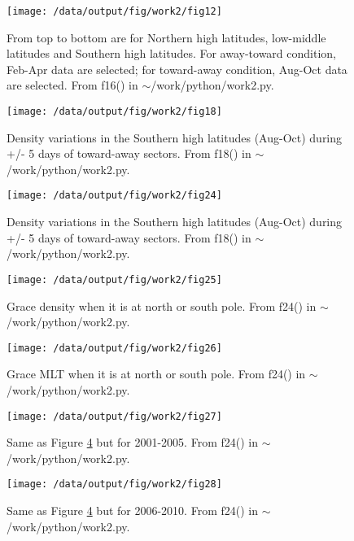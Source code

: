 \documentclass[12pt,a4paper]{article}
\begin{document}
\begin{figure}[!ht]
    \centering
    \texttt{[image: /data/output/fig/work2/fig12]}
    \label{fig7}
    \caption{From top to bottom are for Northern high latitudes, low-middle latitudes and Southern high latitudes. For away-toward condition, Feb-Apr data are selected; for toward-away condition, Aug-Oct data are selected. From f16() in $\sim$/work/python/work2.py.}
\end{figure}

\begin{figure}[!ht]
    \centering
    \texttt{[image: /data/output/fig/work2/fig18]}
    \label{fig8}
    \caption{Density variations in the Southern high latitudes (Aug-Oct) during +/- 5 days of toward-away sectors. From f18() in $\sim$/work/python/work2.py.}
\end{figure}

\begin{figure}[!ht]
    \centering
    \texttt{[image: /data/output/fig/work2/fig24]}
    \label{fig9}
    \caption{Density variations in the Southern high latitudes (Aug-Oct) during +/- 5 days of toward-away sectors. From f18() in $\sim$/work/python/work2.py.}
\end{figure}

\begin{figure}[!ht]
    \centering
    \texttt{[image: /data/output/fig/work2/fig25]}
    \caption{Grace density when it is at north or south pole. From f24() in $\sim$/work/python/work2.py.}
    \label{fig10}
\end{figure}

\begin{figure}[!ht]
    \centering
    \texttt{[image: /data/output/fig/work2/fig26]}
    \label{fig11}
    \caption{Grace MLT when it is at north or south pole. From f24() in $\sim$/work/python/work2.py.}
\end{figure}

\begin{figure}[!ht]
    \centering
    \texttt{[image: /data/output/fig/work2/fig27]}
    \label{fig12}
    \caption{Same as Figure \ref{fig10} but for 2001-2005. From f24() in $\sim$/work/python/work2.py.}
\end{figure}

\begin{figure}[!ht]
    \centering
    \texttt{[image: /data/output/fig/work2/fig28]}
    \label{fig13}
    \caption{Same as Figure \ref{fig10} but for 2006-2010. From f24() in $\sim$/work/python/work2.py.}
\end{figure}
\end{document}
